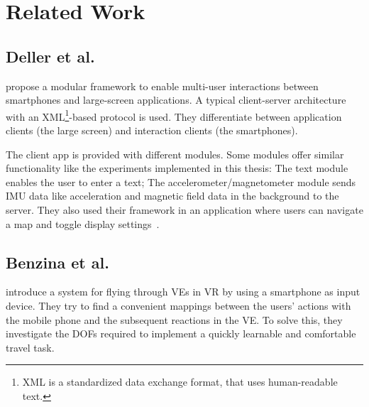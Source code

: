 \chapter{Related Work}\label{chapter:related-work}


\section{Deller et al.}\label{section:deller-2011}
\citeauthor{Deller.2011} propose a modular framework to enable multi-user interactions between smartphones and large-screen applications. A typical client-server architecture with an XML\footnote{XML is a standardized data exchange format, that uses human-readable text.}-based protocol is used. They differentiate between application clients (the large screen) and interaction clients (the smartphones). 

The client app is provided with different modules. Some modules offer similar functionality like the experiments implemented in this thesis: The text module enables the user to enter a text; The accelerometer/magnetometer module sends \ac{IMU} data like acceleration and magnetic field data in the background to the server. They also used their framework in an application where users can navigate a map and toggle display settings~\cite{Deller.2011}.


\section{Benzina et al.}\label{section:benzina-2011}
\citeauthor{Benzina.2011} introduce a system for flying through \acp{VE} in \ac{VR} by using a smartphone as input device. 
They try to find a convenient mappings between the users' actions with the mobile phone and the subsequent reactions in the \ac{VE}. To solve this, they investigate the \acp{DOF} required to implement a quickly learnable and comfortable travel task.

